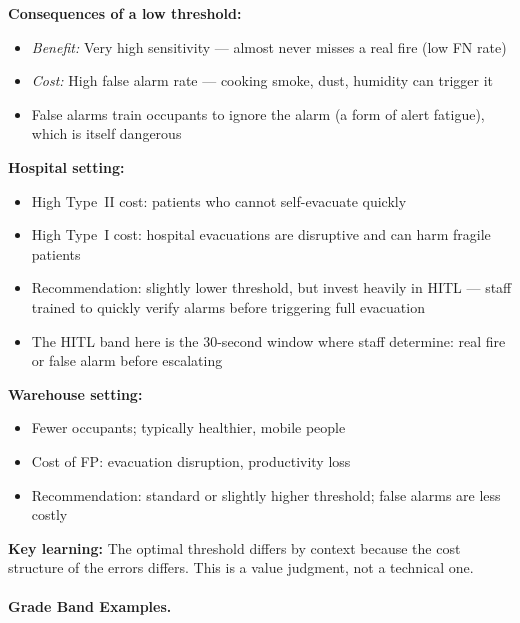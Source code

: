 \textbf{Consequences of a low threshold:}
\begin{itemize}
    \item \textit{Benefit:} Very high sensitivity --- almost never misses a real fire (low FN rate)
    \item \textit{Cost:} High false alarm rate --- cooking smoke, dust, humidity can trigger it
    \item False alarms train occupants to ignore the alarm (a form of alert fatigue), which is itself dangerous
\end{itemize}

\textbf{Hospital setting:}
\begin{itemize}
    \item High Type~II cost: patients who cannot self-evacuate quickly
    \item High Type~I cost: hospital evacuations are disruptive and can harm fragile patients
    \item Recommendation: slightly lower threshold, but invest heavily in HITL --- staff trained to quickly verify alarms before triggering full evacuation
    \item The HITL band here is the 30-second window where staff determine: real fire or false alarm before escalating
\end{itemize}

\textbf{Warehouse setting:}
\begin{itemize}
    \item Fewer occupants; typically healthier, mobile people
    \item Cost of FP: evacuation disruption, productivity loss
    \item Recommendation: standard or slightly higher threshold; false alarms are less costly
\end{itemize}

\textbf{Key learning:} The optimal threshold differs by context because the cost structure of the errors differs. This is a value judgment, not a technical one.

\paragraph{Grade Band Examples.}

